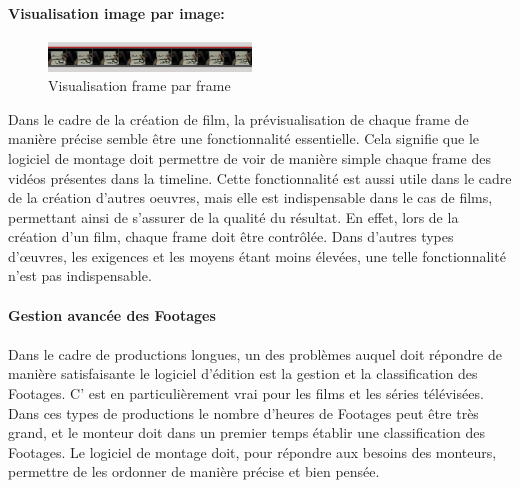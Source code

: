\paragraph{Visualisation image par image:}

\begin{figure}

    \begin{center}

      \includegraphics[width=0.48\textwidth]{images/frameByFrame}

    \end{center} \caption{Visualisation frame par frame} \label{Yes}

\end{figure}

Dans le cadre de la création de film, la prévisualisation de
chaque frame de manière précise semble être une fonctionnalité
essentielle. Cela signifie que le logiciel de montage doit permettre
de voir de manière simple chaque frame des vidéos présentes dans
la timeline. Cette fonctionnalité est aussi utile dans le cadre de la
création d'autres oeuvres, mais elle est indispensable dans le cas de
films, permettant ainsi de s'assurer de la qualité du résultat. En
effet, lors de la création d'un film, chaque frame doit être
contrôlée.  Dans d'autres types d'œuvres, les exigences et les moyens
étant moins élevées, une telle fonctionnalité n'est pas indispensable.

\paragraph{Gestion avancée des Footages}

\paragraph{}

Dans le cadre de productions longues, un des problèmes auquel doit
répondre de manière satisfaisante le logiciel d'édition est la gestion
et la classification des Footages. C' est en particulièrement vrai pour
les films et les séries télévisées.  Dans ces types de productions
le nombre d'heures de Footages peut être très grand, et le monteur
doit dans un premier temps établir une classification des Footages. Le
logiciel de montage doit, pour répondre aux besoins des monteurs,
permettre de les ordonner de manière précise et bien pensée.

